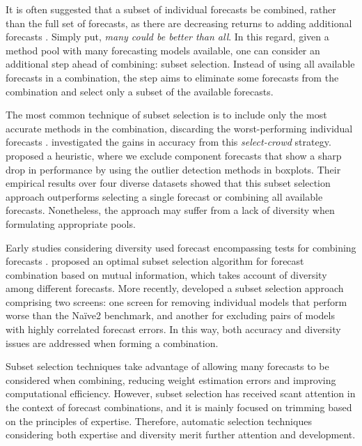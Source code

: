 \documentclass[11pt]{article}
\begin{document}
It is often suggested that a subset of individual forecasts be combined, rather than the full set of forecasts, as there are decreasing returns to adding additional forecasts \citep{Armstrong2001-sj,Zhou2002-cg,Hibon2005-ok,Geweke2011-xk,Lichtendahl2020-ut}. Simply put, \textit{many could be better than all}. In this regard, given a method pool with many forecasting models available, one can consider an additional step ahead of combining: subset selection. Instead of using all available forecasts in a combination, the step aims to eliminate some forecasts from the combination and select only a subset of the available forecasts.

The most common technique of subset selection is to include only the most accurate methods in the combination, discarding the worst-performing individual forecasts \citep[e.g.,][]{Granger2004-sw}. \citet{Mannes2014-dl} investigated the gains in accuracy from this \textit{select-crowd} strategy. \citet{Kourentzes2019-na} proposed a heuristic, where we exclude component forecasts that show a sharp drop in performance by using the outlier detection methods in boxplots. Their empirical results over four diverse datasets showed that this subset selection approach outperforms selecting a single forecast or combining all available forecasts. Nonetheless, the approach may suffer from a lack of diversity when formulating appropriate pools.

Early studies considering diversity used forecast encompassing tests for combining forecasts \citep[e.g.,][]{encompassing2010,COSTANTINI2010725}. \citet{Cang2014-tp} proposed an optimal subset selection algorithm for forecast combination based on mutual information, which takes account of diversity among different forecasts. More recently, \citet{Lichtendahl2020-ut} developed a subset selection approach comprising two screens: one screen for removing individual models that perform worse than the Na\"{i}ve2 benchmark, and another for excluding pairs of models with highly correlated forecast errors. In this way, both accuracy and diversity issues are addressed when forming a combination.

Subset selection techniques take advantage of allowing many forecasts to be considered when combining, reducing weight estimation errors and improving computational efficiency. However, subset selection has received scant attention in the context of forecast combinations, and it is mainly focused on trimming based on the principles of expertise. Therefore, automatic selection techniques considering both expertise and diversity merit further attention and development.
\end{document}
